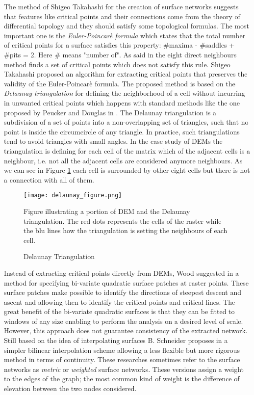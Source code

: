 The method of Shigeo Takahashi  \cite{extracting_surface_topology} for the creation of surface networks suggests that features like critical points and their connections come from the theory of differential topology and they should satisfy some topological formulas. The most important one is the \textit{Euler-Poincarè formula} which states that the total number of critical points for a surface satisfies this property: \#maxima - \#saddles + \#pits = 2. Here \# means "number of". As said in \cite{extracting_surface_topology} the eight direct neighbours method finds a set of critical points which does not satisfy this rule. Shigeo Takahashi proposed an algorithm for extracting critical points that preserves the validity of the Euler-Poincarè formula. The proposed method is based on the \textit{Delaunay triangulation} for defining the neighborhood of a cell without incurring in unwanted critical points which happens with standard methods like the one proposed by Peucker and Douglas in \cite{peackerAndDouglas}. The Delaunay triangulation is a subdivision of a set of points into a non-overlapping set of triangles, such that no point is inside the circumcircle of any triangle. In practice, such triangulations tend to avoid triangles with small angles. In the case study of DEMs the triangulation is defining for each cell of the matrix which of the adjacent cells is a neighbour, i.e. not all the adjacent cells are considered anymore neighbours. As we can see in Figure \ref{fig:delaunay_triangulation} each cell is surrounded by other eight cells but there is not a connection with all of them.
\begin{figure} 
\centering
\texttt{[image: delaunay\_figure.png]}
\caption{Delaunay Triangulation}
Figure illustrating a portion of DEM and the Delaunay triangulation. The red dots represents the cells of the raster while the blu lines how the triangulation is setting the neighbours of each cell.
\label{fig:delaunay_triangulation}
\end{figure}
Instead of extracting critical points directly from DEMs, Wood suggested in \cite{wood_book} a method for specifying bi-variate quadratic surface patches at raster points. These surface patches make possible to identify the directions of steepest descent and ascent and allowing then to identify the critical points and critical lines. The great benefit of the bi-variate quadratic surfaces is that they can be fitted to windows of any size enabling to perform the analysis on a desired level of scale. However, this approach does not guarantee consistency of the extracted network. Still based on the idea of interpolating surfaces B. Schneider proposes in \cite{Schneider} a simpler bilinear interpolation scheme allowing a less flexible but more rigorous method in terms of continuity. These researches sometimes refer to the surface networks as \textit{metric} or \textit{weighted} surface networks. These versions assign a weight to the edges of the graph; the most common kind of weight is the difference of elevation between the two nodes considered.

